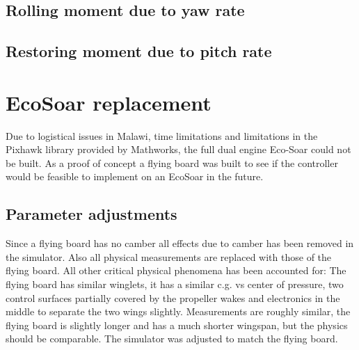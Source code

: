 \documentclass{article}
\begin{document}
\subsection{Rolling moment due to yaw rate}


\subsection{Restoring moment due to pitch rate}









\section{EcoSoar replacement}
Due to logistical issues in Malawi, time limitations and limitations in the Pixhawk library provided by Mathworks, the full dual engine Eco-Soar could not be built.
As a proof of concept a flying board was built to see if the controller would be feasible to implement on an EcoSoar in the future.
\subsection{Parameter adjustments}
Since a flying board has no camber all effects due to camber has been removed in the simulator.
Also all physical measurements are replaced with those of the flying board.
All other critical physical phenomena has been accounted for:
The flying board has similar winglets, it has a similar c.g. vs center of pressure, two control surfaces partially covered by the propeller wakes and electronics in the middle to separate the two wings slightly. 
Measurements are roughly similar, the flying board is slightly longer and has a much shorter wingspan, but the physics should be comparable.
The simulator was adjusted to match the flying board.
\end{document}
